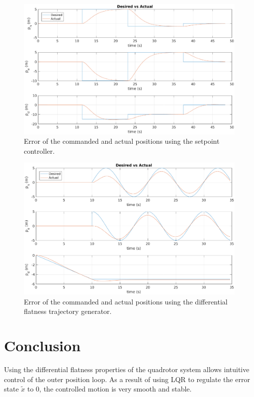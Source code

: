 \documentclass[12pt]{article}
\begin{document}
\begin{figure}[H]
	\centering
	\includegraphics[scale=0.55]{hex_sim_desired_vs_actual}
	\caption{Error of the commanded and actual positions using the setpoint controller.}
	\label{fig:matlab_setpoint_results}
\end{figure}

\begin{figure}[H]
	\centering
	\includegraphics[scale=0.55]{hex_sim_desired_vs_actual_diff_flat}
	\caption{Error of the commanded and actual positions using the differential flatness trajectory generator.}
	\label{fig:matlab_diff_flat_results}
\end{figure}

\section{Conclusion}

Using the differential flatness properties of the quadrotor system allows intuitive control of the outer position loop. As a result of using LQR to regulate the error state $\tilde{x}$ to $0$, the controlled motion is very smooth and stable.
\end{document}

